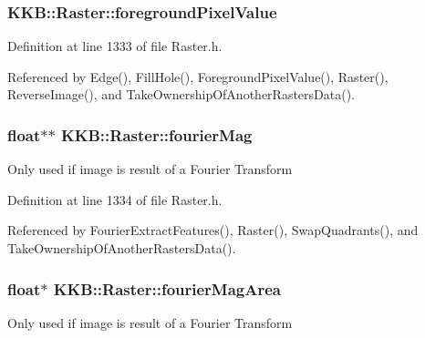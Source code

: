 \subsubsection[{\texorpdfstring{foreground\+Pixel\+Value}{foregroundPixelValue}}]{ K\+K\+B\+::\+Raster\+::foreground\+Pixel\+Value\hspace{0.3cm}{\ttfamily [protected]}}\hypertarget{class_k_k_b_1_1_raster_ac9a5cec097e9fed669fe3c44bcc1678c}{}\label{class_k_k_b_1_1_raster_ac9a5cec097e9fed669fe3c44bcc1678c}


Definition at line 1333 of file Raster.\+h.



Referenced by Edge(), Fill\+Hole(), Foreground\+Pixel\+Value(), Raster(), Reverse\+Image(), and Take\+Ownership\+Of\+Another\+Rasters\+Data().

\subsubsection[{\texorpdfstring{fourier\+Mag}{fourierMag}}]{\setlength{\rightskip}{0pt plus 5cm}float$\ast$$\ast$ K\+K\+B\+::\+Raster\+::fourier\+Mag\hspace{0.3cm}{\ttfamily [protected]}}\hypertarget{class_k_k_b_1_1_raster_a16d18df2f29a49c7a8ee670e0ea0c3a9}{}\label{class_k_k_b_1_1_raster_a16d18df2f29a49c7a8ee670e0ea0c3a9}
Only used if image is result of a Fourier Transform 

Definition at line 1334 of file Raster.\+h.



Referenced by Fourier\+Extract\+Features(), Raster(), Swap\+Quadrants(), and Take\+Ownership\+Of\+Another\+Rasters\+Data().

\subsubsection[{\texorpdfstring{fourier\+Mag\+Area}{fourierMagArea}}]{\setlength{\rightskip}{0pt plus 5cm}float$\ast$ K\+K\+B\+::\+Raster\+::fourier\+Mag\+Area\hspace{0.3cm}{\ttfamily [protected]}}\hypertarget{class_k_k_b_1_1_raster_adc50969a106f5b57aca3a9ce512df0ce}{}\label{class_k_k_b_1_1_raster_adc50969a106f5b57aca3a9ce512df0ce}
Only used if image is result of a Fourier Transform 


